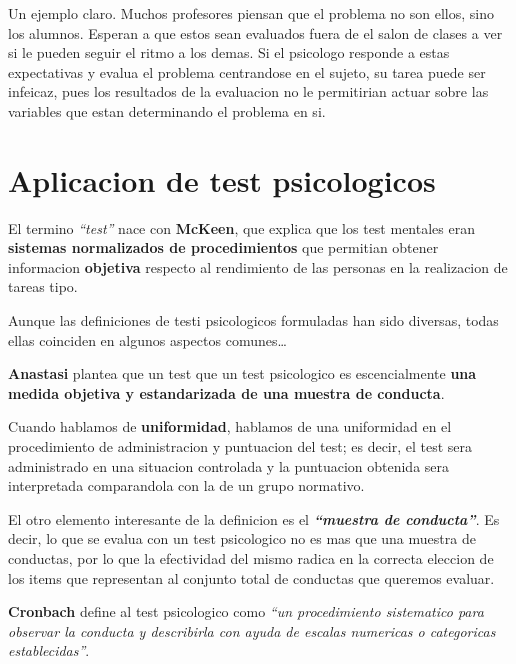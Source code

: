 \documentclass[12pt,a4paper]{article}
\begin{document}
Un ejemplo claro. Muchos profesores piensan que el problema no son ellos, sino los alumnos. Esperan a que estos sean evaluados fuera de el salon de clases a ver si le pueden seguir el ritmo a los demas. Si el psicologo responde a estas expectativas y evalua el problema centrandose en el sujeto, su tarea puede ser infeicaz, pues los resultados de la evaluacion no le permitirian actuar sobre las variables que estan determinando el problema en si.

\section{Aplicacion de test psicologicos}%

\begin{shaded}
El termino \textit{\enquote{test}} nace con \textbf{McKeen}, que explica que los test mentales eran \textbf{sistemas normalizados de procedimientos} que permitian obtener informacion \textbf{objetiva} respecto al rendimiento de las personas en la realizacion de tareas tipo. 
\end{shaded}

Aunque las definiciones de testi psicologicos formuladas han sido diversas, todas ellas coinciden en algunos aspectos comunes\ldots

\begin{shaded}
\textbf{Anastasi} plantea que un test que un test psicologico es escencialmente \textbf{una medida objetiva y estandarizada de una muestra de conducta}.  
\end{shaded}

Cuando hablamos de \textbf{uniformidad}, hablamos de una uniformidad en el procedimiento de administracion y puntuacion del test; es decir, el test sera administrado en una situacion controlada y la puntuacion obtenida sera interpretada comparandola con la de un grupo normativo. 

El otro elemento interesante de la definicion es el \textbf{ \textit{\enquote{muestra de conducta}}}. Es decir, lo que se evalua con un test psicologico no es mas que una muestra de conductas, por lo que la efectividad del mismo radica en la correcta eleccion de los items que representan al conjunto total de conductas que queremos evaluar. 

\begin{shaded}
\textbf{Cronbach} define al test psicologico como \textit{\enquote{un procedimiento sistematico para observar la conducta y describirla con ayuda de escalas numericas o categoricas establecidas}}.
\end{shaded}
\end{document}

